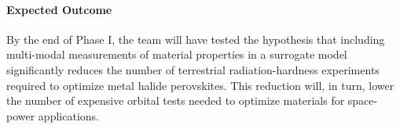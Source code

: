 \documentclass[../main.tex]{subfiles}
\begin{document}
\paragraph{Expected Outcome}
By the end of Phase I, the team will have tested the hypothesis that  including multi-modal measurements of material properties in a surrogate model significantly reduces the number of terrestrial radiation-hardness experiments required to optimize metal halide perovskites.
This reduction will, in turn, lower the number of expensive orbital tests needed to optimize materials for space-power applications.






\end{document}
